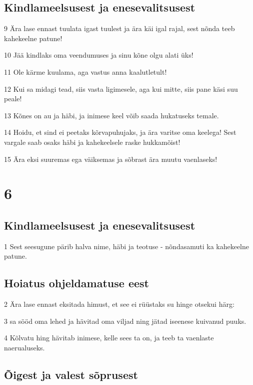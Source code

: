 \section*{Kindlameelsusest ja enesevalitsusest}

\par 9 Ära lase ennast tuulata igast tuulest ja ära käi igal rajal, sest nõnda teeb kahekeelne patune!
\par 10 Jää kindlaks oma veendumuses ja sinu kõne olgu alati üks!
\par 11 Ole kärme kuulama, aga vastus anna kaalutletult!
\par 12 Kui sa midagi tead, siis vasta ligimesele, aga kui mitte, siis pane käsi suu peale!
\par 13 Kõnes on au ja häbi, ja inimese keel võib saada hukatuseks temale.
\par 14 Hoidu, et sind ei peetaks kõrvapuhujaks, ja ära varitse oma keelega! Sest vargale saab osaks häbi ja kahekeelsele raske hukkamõist!
\par 15 Ära eksi suuremas ega väiksemas ja sõbrast ära muutu vaenlaseks!

\chapter{6}

\section*{Kindlameelsusest ja enesevalitsusest}

\par 1 Sest seesugune pärib halva nime, häbi ja teotuse - nõndasamuti ka kahekeelne patune.

\section*{Hoiatus ohjeldamatuse eest}

\par 2 Ära lase ennast eksitada himust, et see ei rüüstaks su hinge otsekui härg:
\par 3 sa sööd oma lehed ja hävitad oma viljad ning jätad iseenese kuivanud puuks.
\par 4 Kõlvatu hing hävitab inimese, kelle sees ta on, ja teeb ta vaenlaste naerualuseks.

\section*{Õigest ja valest sõprusest}

